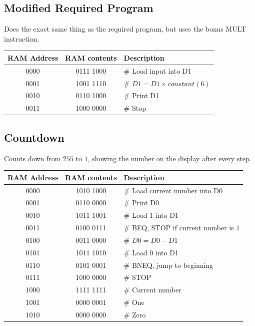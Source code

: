 \documentclass{mcgillhomework}
\begin{document}
	\subsection{Modified Required Program}
	Does the exact same thing as the required program, but uses the bonus MULT instruction.
	\\\begin{tabular}{|c|c|l|}
		\hline \textbf{RAM Address} & \textbf{RAM contents} & \textbf{Description}
		\\ \hline 0000 & 0111 1000 & \# Load input into D1
		\\ \hline 0001 & 1001 1110 & \# $D1=D1\times constant(6)$
		\\ \hline 0010 & 0110 1000 & \# Print D1
		\\ \hline 0011 & 1000 0000 & \# Stop
		\\ \hline
	\end{tabular}
	\subsection{Countdown}
	Counts down from $255$ to $1$, showing the number on the display after every step.
	\\\begin{tabular}{|c|c|l|}
		\hline \textbf{RAM Address} & \textbf{RAM contents} & \textbf{Description}
		\\ \hline 0000 & 1010 1000& \# Load current number into D0
		\\ \hline 0001 & 0110 0000 & \# Print D0
		\\ \hline 0010 & 1011 1001 & \# Load $1$ into D1
		\\ \hline 0011 & 0100 0111 & \# BEQ, STOP if current number is $1$
		\\ \hline 0100 & 0011 0000 & \# $D0=D0-D1$
		\\ \hline 0101 & 1011 1010 & \# Load $0$ into D1
		\\ \hline 0110 & 0101 0001 & \# BNEQ, jump to beginning
		\\ \hline 0111 & 1000 0000 & \# STOP
		\\ \hline 1000 & 1111 1111 & \# Current number
		\\ \hline 1001 & 0000 0001 & \# One
		\\ \hline 1010 & 0000 0000 & \# Zero
		\\ \hline
	\end{tabular}
\end{document}

